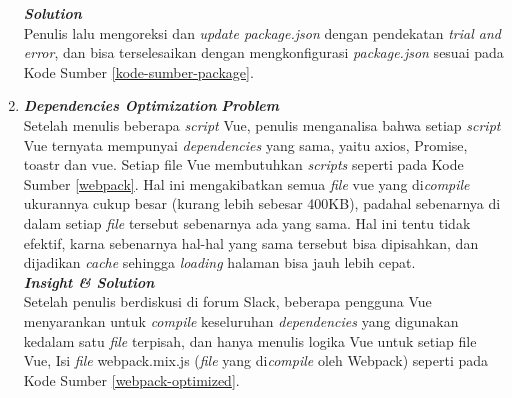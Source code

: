 \begin{enumerate}
  \textbf{\textit{Solution}} \\
  Penulis lalu mengoreksi dan \textit{update package.json} dengan pendekatan \textit{trial and error}, dan bisa terselesaikan dengan mengkonfigurasi \textit{package.json} sesuai pada Kode Sumber \ref{kode-sumber-package}.\\

				  
\item 
	\textbf{\textit{Dependencies Optimization}} \textbf{\textit{Problem}} \\
	Setelah menulis beberapa \textit{script} Vue, penulis menganalisa bahwa setiap \textit{script} Vue ternyata mempunyai \textit{dependencies} yang sama, yaitu axios, Promise, toastr dan vue. Setiap file Vue membutuhkan \textit{scripts} seperti pada Kode Sumber \ref{webpack}. Hal ini mengakibatkan semua \textit{file} vue yang di\textit{compile} ukurannya cukup besar (kurang lebih sebesar 400KB), padahal sebenarnya di dalam setiap \textit{file} tersebut sebenarnya ada yang sama. Hal ini tentu tidak efektif, karna sebenarnya hal-hal yang sama tersebut bisa dipisahkan, dan dijadikan \textit{cache} sehingga \textit{loading} halaman bisa jauh lebih cepat.\\
		
	\textbf{\textit{Insight \& Solution}} \\
	Setelah penulis berdiskusi di forum Slack, beberapa pengguna Vue menyarankan untuk \textit{compile} keseluruhan \textit{dependencies} yang digunakan kedalam satu \textit{file} terpisah, dan hanya menulis logika Vue untuk setiap file Vue, Isi \textit{file} webpack.mix.js (\textit{file} yang di\textit{compile} oleh Webpack) seperti pada Kode Sumber \ref{webpack-optimized}.

\end{enumerate}



